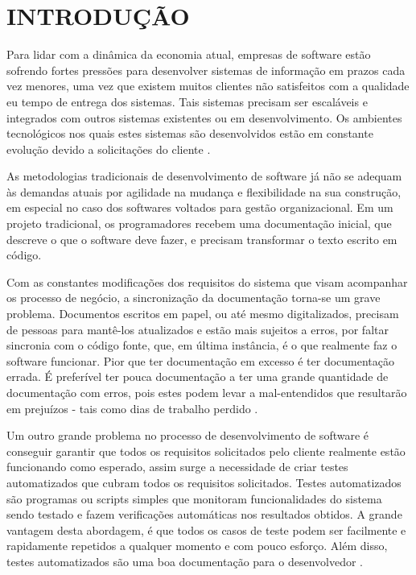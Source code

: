\chapter{INTRODUÇÃO}

Para lidar com a dinâmica da economia atual, empresas de software estão sofrendo fortes pressões para desenvolver sistemas de informação em prazos cada vez menores, uma vez que existem muitos clientes não satisfeitos com a qualidade eu tempo de entrega dos sistemas. Tais sistemas precisam ser escaláveis e integrados com outros sistemas existentes ou em desenvolvimento. Os ambientes tecnológicos nos quais estes sistemas são desenvolvidos estão em constante evolução devido a solicitações do cliente \cite{CRESPO}.

As metodologias tradicionais de desenvolvimento de software já não se adequam às demandas atuais por agilidade na mudança e flexibilidade na sua construção, em especial no caso dos softwares voltados para gestão organizacional. Em um projeto tradicional, os programadores recebem uma documentação inicial, que descreve o que o software deve fazer, e precisam transformar o texto escrito em código.

Com as constantes modificações dos requisitos do sistema que visam acompanhar os processo de negócio, a sincronização da documentação torna-se um grave problema. Documentos escritos em papel, ou até mesmo digitalizados, precisam de pessoas para mantê-los atualizados e estão mais sujeitos a erros, por faltar sincronia com o código fonte, que, em última instância, é o que realmente faz o software funcionar. Pior que ter documentação em excesso é ter documentação errada. É preferível ter pouca documentação a ter uma grande quantidade de documentação com erros, pois estes podem levar a mal-entendidos que resultarão em prejuízos - tais como dias de trabalho perdido \cite{NSI}.

Um outro grande problema no processo de desenvolvimento de software é conseguir garantir que todos os requisitos solicitados pelo cliente realmente estão funcionando como esperado, assim surge a necessidade de criar testes automatizados que cubram todos os requisitos solicitados. Testes automatizados são programas ou scripts simples que monitoram funcionalidades do sistema sendo testado e fazem verificações automáticas nos resultados obtidos. A grande vantagem desta abordagem, é que todos os casos de teste podem ser facilmente e rapidamente repetidos a qualquer momento e com pouco esforço. Além disso, testes automatizados são uma boa documentação para o desenvolvedor \cite{KON}.

